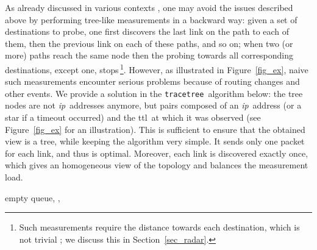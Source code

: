 \documentclass[times, 10pt,twocolumn]{article}
\newcommand{\tracetree}{{\tt trace\-tree}}
\newcommand{\ip}{\mbox{\em \sc ip}}
\newcommand{\ttl}{\mbox{\sc ttl}}
\begin{document}
As already discussed in various contexts
\cite{DTJSAC,DTSigmetrics,probingScheme,pansiot2007multicast,streamlining,scriptroute},
one may avoid the issues described
above by performing tree-like measurements in a backward way: given a
set of destinations to probe, one first discovers the last link on the
path to each of them, then the previous link on each of these paths,
and so on; when two (or more) paths reach the same node then the
probing towards all corresponding destinations, except one,
stops\,\footnote{Such measurements require the distance towards each
  destination, which is not trivial \cite{streamlining}; we discuss
  this in Section~\ref{sec_radar}.}.  However, as illustrated in
Figure~\ref{fig_ex}, naive such measurements encounter serious
problems because of routing changes and other events.
We provide a solution in
the \tracetree\ algorithm below: the tree nodes are not \ip\ addresses
anymore, but pairs composed of an \ip\ address (or a
star if a timeout occurred) and the \ttl\ at which it was observed
(see Figure~\ref{fig_ex} for an illustration). This is sufficient to
ensure that the obtained view is a tree, while keeping the algorithm
very simple. It sends only one packet for each link, and
thus is optimal.
Moreover, each link is discovered exactly
once, which gives an homogeneous view of the topology and balances the
measurement load.

\begin{algorithm}[H]
\caption{\tracetree\ algorithm.}
\dontprintsemicolon
{}
 \Gets empty queue,
 \Gets ,
 \Gets \;
\;
\label{algo_tracetree}
\end{algorithm}
\end{document}
